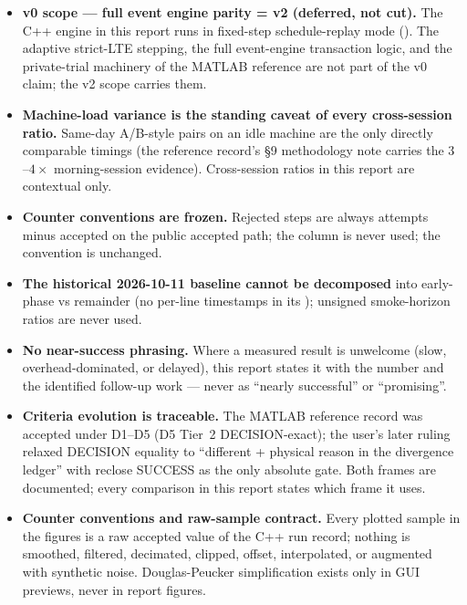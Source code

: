 \begin{itemize}
\item \textbf{v0 scope --- full event engine parity = v2 (deferred, not
      cut).}  The C++ engine in this report runs in fixed-step
      schedule-replay mode (\intmodes).  The adaptive strict-LTE stepping,
      the full event-engine transaction logic, and the private-trial
      machinery of the MATLAB reference are not part of the v0 claim; the
      v2 scope carries them.
\item \textbf{Machine-load variance is the standing caveat of every
      cross-session ratio.}  Same-day A/B-style pairs on an idle machine
      are the only directly comparable timings (the reference record's
      \S9 methodology note carries the $3$--$4\times$ morning-session
      evidence).  Cross-session ratios in this report are contextual
      only.
\item \textbf{Counter conventions are frozen.}  Rejected steps are always
      attempts minus accepted on the public accepted path; the
        column is never used; the
       convention is unchanged.
\item \textbf{The historical 2026-10-11 baseline cannot be decomposed}
      into early-phase vs remainder (no per-line timestamps in its
      ); unsigned smoke-horizon ratios are never used.
\item \textbf{No near-success phrasing.}  Where a measured result is
      unwelcome (slow, overhead-dominated, or delayed), this report states
      it with the number and the identified follow-up work --- never as
      ``nearly successful'' or ``promising''.
\item \textbf{Criteria evolution is traceable.}  The MATLAB reference
      record was accepted under D1--D5 (D5 Tier~2 DECISION-exact); the
      user's later ruling relaxed DECISION equality to ``different +
      physical reason in the divergence ledger'' with reclose SUCCESS as
      the only absolute gate.  Both frames are documented; every
      comparison in this report states which frame it uses.
\item \textbf{Counter conventions and raw-sample contract.}  Every plotted
      sample in the figures is a raw accepted value of the C++ run record;
      nothing is smoothed, filtered, decimated, clipped, offset,
      interpolated, or augmented with synthetic noise.  Douglas-Peucker
      simplification exists only in GUI previews, never in report
      figures.
\end{itemize}
